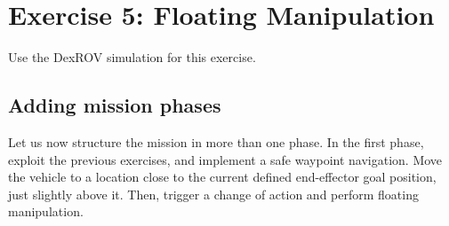	\section{Exercise 5: Floating Manipulation}

	Use the DexROV simulation for this exercise.

	\subsection{Adding mission phases}
	\question
	Let us now structure the mission in more than one phase. In the first phase,
	exploit the previous exercises, and implement a safe waypoint navigation. Move
	the vehicle to a location close to the current defined end-effector goal
	position, just slightly above it. Then, trigger a change of action and perform
	floating manipulation.

